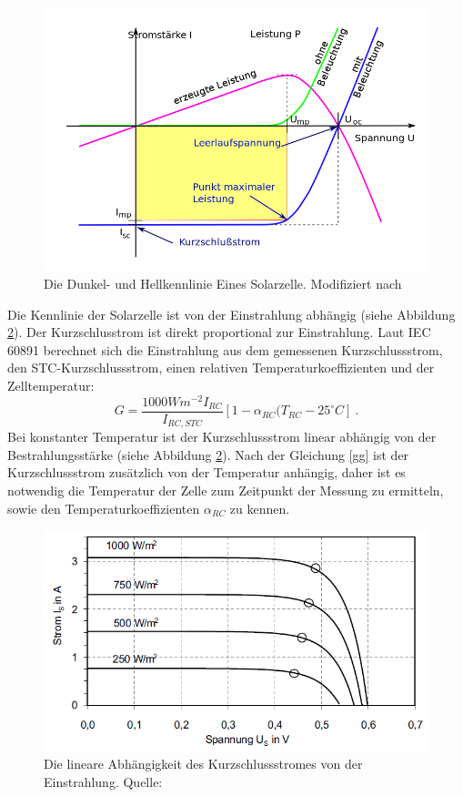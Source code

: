\documentclass[a4paper,bibtotoc,oneside]{scrbook}
\begin{document}
\begin{figure}[htbp]
\centering
\includegraphics[width=125mm]{img/kennlinie.png}
\caption{Die Dunkel- und Hellkennlinie Eines Solarzelle. Modifiziert nach \cite{kl}}\label{kennlinie}
\end{figure}

Die Kennlinie der Solarzelle ist von der Einstrahlung abhängig (siehe Abbildung \ref{mpp}). Der Kurzschlusstrom ist direkt proportional zur Einstrahlung.
Laut IEC 60891 \cite{norm891} berechnet sich die Einstrahlung aus dem gemessenen Kurzschlussstrom, den STC-Kurzschlussstrom, einen relativen Temperaturkoeffizienten und der Zelltemperatur:
\begin{equation}
G = \frac{1000Wm^{-2}I_{RC}}{I_{RC,STC}} [1 - \alpha_{RC}(T_{RC}-25^{\circ} C]~.
\label{gg}
\end{equation}
Bei konstanter Temperatur ist der Kurzschlussstrom linear abhängig von der Bestrahlungsstärke (siehe Abbildung \ref{mpp}).
Nach der Gleichung \ref{gg} ist der Kurzschlussstrom zusätzlich von der Temperatur anhängig, daher ist es notwendig die Temperatur der Zelle zum Zeitpunkt der Messung zu ermitteln, sowie den Temperaturkoeffizienten $\alpha_{RC}$ zu kennen.
\begin{figure}[htbp]
\centering
\includegraphics[width=125mm]{img/kennlinien.png}
\caption{Die lineare Abhängigkeit des Kurzschlussstromes von der Einstrahlung. Quelle: \cite{pv}}\label{mpp}
\end{figure}
\end{document}
